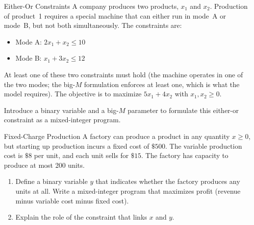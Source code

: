 \begin{ex}{Either-Or Constraints}{}
\label{ex:either-or-modes}
 A company produces two products, $x_1$ and $x_2$. Production of product~1 requires a special machine that can either run in mode~A or mode~B, but not both simultaneously.  The constraints are:
\begin{itemize}
\item Mode A: $2x_1 + x_2 \leq 10$
\item Mode B: $x_1 + 3x_2 \leq 12$
\end{itemize}
At least one of these two constraints must hold (the machine operates in one of the two modes; the big-$M$ formulation enforces at least one, which is what the model requires). The objective is to maximize $5x_1 + 4x_2$ with $x_1, x_2 \geq 0$.

Introduce a binary variable and a big-$M$ parameter to formulate this either-or constraint as a mixed-integer program.
\exrefs{\S\ref{subsec:either-or}}
\end{ex}

\begin{ex}{Fixed-Charge Production}{}
\label{ex:fixed-charge}
 A factory can produce a product in any quantity $x \geq 0$, but starting up production incurs a fixed cost of $\$500$.  The variable production cost is $\$8$ per unit, and each unit sells for $\$15$.  The factory has capacity to produce at most 200 units.

\begin{enumerate}
\item Define a binary variable $y$ that indicates whether the factory produces any units at all. Write a mixed-integer program that maximizes profit (revenue minus variable cost minus fixed cost).
\item Explain the role of the constraint that links $x$ and $y$.
\end{enumerate}
\exrefs{\S\ref{subsec:big-M-activation}}
\end{ex}


